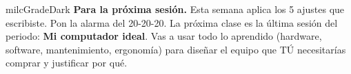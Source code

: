 \documentclass[11pt,letterpaper]{article}
\begin{document}
\begin{infoband}{milcGradeDark}
\textbf{Para la próxima sesión.} Esta semana aplica los 5 ajustes que escribiste. Pon la alarma del 20-20-20. La próxima clase es la última sesión del periodo: \textbf{Mi computador ideal}. Vas a usar todo lo aprendido (hardware, software, mantenimiento, ergonomía) para diseñar el equipo que TÚ necesitarías comprar y justificar por qué.
\end{infoband}
\end{document}
